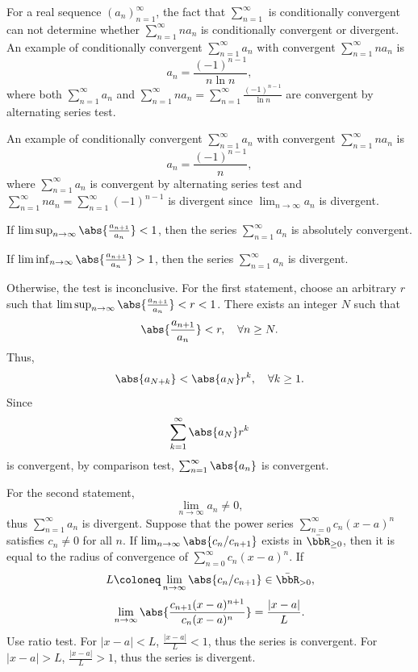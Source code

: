 \epr
{}
For a real sequence $(a_n)_{n=1}^{\infty}$, the fact that $\sum_{n=1}^{\infty}$ is conditionally convergent can not determine whether $\sum_{n=1}^{\infty}na_n$ is conditionally convergent or divergent.
\bpr
An example of conditionally convergent $\sum_{n=1}^{\infty}a_n$ with convergent $\sum_{n=1}^{\infty}na_n$ is
\[a_n=\frac{(-1)^{n-1}}{n\ln n},\]
where both $\sum_{n=1}^{\infty}a_n$ and $\sum_{n=1}^{\infty}na_n=\sum_{n=1}^{\infty}\frac{(-1)^{n-1}}{\ln n}$ are convergent by alternating series test.

An example of conditionally convergent $\sum_{n=1}^{\infty}a_n$ with convergent $\sum_{n=1}^{\infty}na_n$ is
\[a_n=\frac{(-1)^{n-1}}{n},\]
where $\sum_{n=1}^{\infty}a_n$ is convergent by alternating series test and $\sum_{n=1}^{\infty}na_n=\sum_{n=1}^{\infty}(-1)^{n-1}$ is divergent since $\lim_{n\to\infty}a_n$ is divergent.
\epr
{}
\ben
\item If $\limsup_{n\to\infty}\abs{\frac{a_{n+1}}{a_n}}<1$, then the series $\sum_{n=1}^{\infty}a_n$ is absolutely convergent.
\item If $\liminf_{n\to\infty}\abs{\frac{a_{n+1}}{a_n}}>1$, then the series $\sum_{n=1}^{\infty}a_n$ is divergent.
\item Otherwise, the test is inconclusive.
\een
\bpr
For the first statement, choose an arbitrary $r$ such that $\limsup_{n\to\infty}\abs{\frac{a_{n+1}}{a_n}}<r<1$. There exists an integer $N$ such that
\[\abs{\frac{a_{n+1}}{a_n}}<r,\quad\forall n\geq N.\]
Thus,
\[\abs{a_{N+k}}<\abs{a_N}r^k,\quad\forall k\geq 1.\]
Since
\[\sum_{k=1}^{\infty}\abs{a_N}r^k\]
is convergent, by comparison test, $\sum_{n=1}^{\infty}\abs{a_n}$ is convergent.

For the second statement,
\[\lim_{n\to\infty}a_n\neq 0,\]
thus $\sum_{n=1}^{\infty}a_n$ is divergent.
\epr
{}
Suppose that the power series $\sum_{n=0}^{\infty}c_n(x-a)^n$ satisfies $c_n\ne0$ for all $n$. If $\lim_{n\to\infty}\abs{c_n/c_{n+1}}$ exists in $\bar{\bbR}_{\ge0}$, then it is equal to the radius of convergence of $\sum_{n=0}^{\infty}c_n(x-a)^n$.
\bpr
If
\[L\coloneq\lim_{n\to\infty}\abs{c_n/c_{n+1}}\in\bar{\bbR}_{>0},\]
\[\lim_{n\to\infty}\abs{\frac{c_{n+1}(x-a)^{n+1}}{c_n(x-a)^n}}=\frac{|x-a|}{L}.\]
Use ratio test. For $|x-a|<L$, $\frac{|x-a|}{L}<1$, thus the series is convergent. For $|x-a|>L$, $\frac{|x-a|}{L}>1$, thus the series is divergent.

